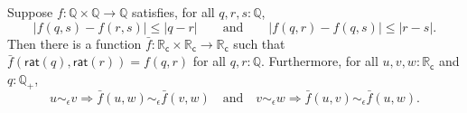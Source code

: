 \documentclass[10pt,a4paper]{article}
\newcommand{\Q}{\ensuremath{\mathbb{Q}}\xspace}
\newcommand{\RC}{\ensuremath{\mathbb{R}_\mathsf{c}}\xspace} %
\newcommand{\close}[1]{\sim_{#1}} %
\newcommand{\rcrat}{\mathsf{rat}} %
\newcommand{\Qp}{\Q_{+}}
\theoremstyle{definition}
\theoremstyle{remark}
\numberwithin{equation}{section}
\begin{document}
\begin{lem} \label{RC-binary-nonexpanding-extension}
  Suppose $f : \Q \times \Q \to \Q$ satisfies, for all $q, r, s : \Q$,
  \begin{equation*}
    |f(q, s) - f(r, s)| \leq |q - r|
    \qquad\text{and}\qquad
    |f(q, r) - f(q, s)| \leq |r - s|.
  \end{equation*}
  Then there is a function $\bar{f} : \RC \times \RC \to \RC$ such that
  $\bar{f}(\rcrat(q), \rcrat(r)) = f(q,r)$ for all $q, r : \Q$. Furthermore,
  for all $u, v, w : \RC$ and $q : \Qp$,
  \begin{equation*}
    u \close\epsilon v \Rightarrow \bar{f}(u,w) \close\epsilon \bar{f}(v,w)
    \quad\text{and}\quad
    v \close\epsilon w \Rightarrow \bar{f}(u,v) \close\epsilon \bar{f}(u,w).
  \end{equation*}
\end{lem}
\end{document}
